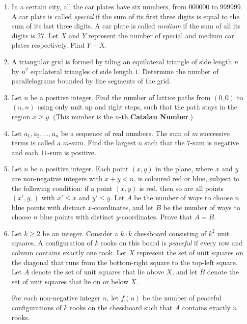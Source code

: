 \documentclass[12pt]{article}
\begin{document}
\begin{enumerate}
	\item In a certain city, all the car plates have six numbers, from $000000$ to $999999$. A car plate is called \textit{special} if the sum of its first three digits is equal to the sum of its last three digits. A car plate is called \textit{medium} if the sum of all its digits is $27$. Let $X$ and $Y$ represent the number of special and medium car plates respectively. Find $Y-X$.
	\item A triangular grid is formed by tiling an equilateral triangle of side length $n$ by $n^2$ equilateral triangles of side length $1$. Determine the number of parallelograms bounded by line segments of the grid.
	\item Let $n$ be a positive integer. Find the number of lattice paths from $(0,0)$ to $(n,n)$ using only unit up and right steps, such that the path stays in the region $x\geq y$. (This number is the $n$-th \textbf{Catalan Number}.)
	\item Let $a_1,a_2,\dots,a_n$ be a sequence of real numbers. The sum of $m$ successive terms is called a $m$-sum. Find the largest $n$ such that the $7$-sum is negative and each $11$-sum is positive.
	\item Let $n$ be a positive integer. Each point $(x,y)$ in the plane, where $x$ and $y$ are non-negative integers with $x+y<n$, is coloured red or blue, subject to the following condition: if a point $(x,y)$ is red, then so are all points $(x',y,)$ with $x'\leq x$ and $y'\leq y$. Let $A$ be the number of ways to choose $n$ blue points with distinct $x$-coordinates, and let $B$ be the number of ways to choose $n$ blue points with distinct $y$-coordinates. Prove that $A=B$.
	\item Let $k\geq 2$ be an integer. Consider a $k\cdot k$ chessboard consisting of $k^2$ unit squares. A configuration of $k$ rooks on this board is \textit{peaceful} if every row and column contains exactly one rook. Let $X$ represent the set of unit squares on the diagonal that runs from the bottom-right square to the top-left square. Let $A$ denote the set of unit squares that lie above $X$, and let $B$ denote the set of unit squares that lie on or below $X$.
	
	\vspace{2mm}
	
	\noindent For each non-negative integer $n$, let $f(n)$ be the number of peaceful configurations of $k$ rooks on the chessboard such that $A$ contains exactly $n$ rooks.
	
	\vspace{2mm}
	

\end{enumerate}
\end{document}
